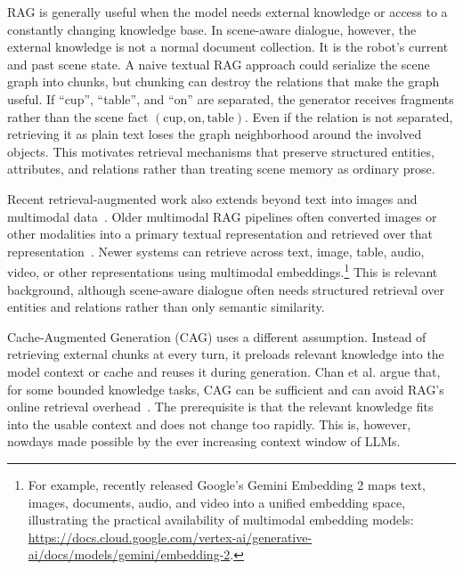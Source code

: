 RAG is generally useful when the model needs external knowledge or access to a constantly changing knowledge base. In scene-aware dialogue, however, the external knowledge is not a normal document collection. It is the robot's current and past scene state. A naive textual RAG approach could serialize the scene graph into chunks, but chunking can destroy the relations that make the graph useful. If \enquote{cup}, \enquote{table}, and \enquote{on} are separated, the generator receives fragments rather than the scene fact \((\text{cup},\text{on},\text{table})\). Even if the relation is not separated, retrieving it as plain text loses the graph neighborhood around the involved objects. This motivates retrieval mechanisms that preserve structured entities, attributes, and relations rather than treating scene memory as ordinary prose.

Recent retrieval-augmented work also extends beyond text into images and multimodal data~\cite{zheng_retrieval_2025}. Older multimodal RAG pipelines often converted images or other modalities into a primary textual representation and retrieved over that representation~\cite[2--4]{mao_multi-rag_2025}. Newer systems can retrieve across text, image, table, audio, video, or other representations using multimodal embeddings.\footnote{For example, recently released Google's Gemini Embedding 2 maps text, images, documents, audio, and video into a unified embedding space, illustrating the practical availability of multimodal embedding models: \url{https://docs.cloud.google.com/vertex-ai/generative-ai/docs/models/gemini/embedding-2}.} This is relevant background, although scene-aware dialogue often needs structured retrieval over entities and relations rather than only semantic similarity.

Cache-Augmented Generation (CAG) uses a different assumption. Instead of retrieving external chunks at every turn, it preloads relevant knowledge into the model context or cache and reuses it during generation. Chan et al. argue that, for some bounded knowledge tasks, CAG can be sufficient and can avoid RAG's online retrieval overhead~\cite{Chan_2025}. The prerequisite is that the relevant knowledge fits into the usable context and does not change too rapidly. This is, however, nowdays made possible by the ever increasing context window of LLMs.

